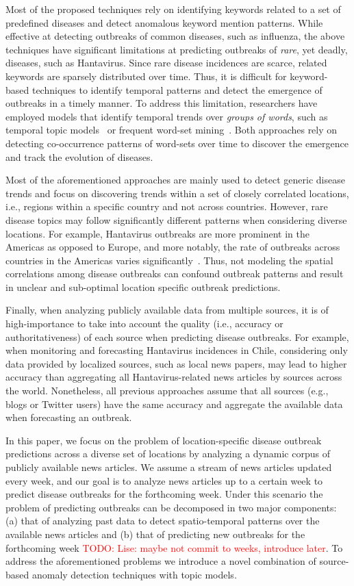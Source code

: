 \documentclass[conference]{IEEEtran}
\newcommand{\todo}[1]{\textcolor{red}{{TODO: #1}}}
\begin{document}
Most of the proposed techniques rely on identifying keywords related to a set of predefined diseases and detect anomalous keyword mention patterns. While effective at detecting outbreaks of common diseases, such as influenza, the above techniques have significant limitations at predicting outbreaks of {\em rare}, yet deadly, diseases, such as Hantavirus. Since rare disease incidences are scarce, related keywords are sparsely distributed over time. Thus, it is difficult for keyword- based techniques to identify temporal patterns and detect the emergence of outbreaks in a timely manner. To address this limitation, researchers have employed models that identify temporal trends over {\em groups of words}, such as temporal topic models~\cite{paul:11} or frequent word-set mining~\cite{parker:13}. Both approaches rely on detecting co-occurrence patterns of word-sets over time to discover the emergence and track the evolution of diseases. 

Most of the aforementioned approaches are mainly used to detect generic disease trends and focus on discovering trends within a set of closely correlated locations, i.e., regions within a specific country and not across countries. However, rare disease topics may follow significantly different patterns when considering diverse locations. For example, Hantavirus outbreaks are more prominent in the Americas as opposed to Europe, and more notably, the rate of outbreaks across countries in the Americas varies significantly~\cite{jonsson:10}. Thus, not modeling the spatial correlations among disease outbreaks can confound outbreak patterns and result in unclear and sub-optimal location specific outbreak predictions. 

Finally, when analyzing publicly available data from multiple sources, it is of high-importance to take into account the quality (i.e., accuracy or authoritativeness) of each source when predicting disease outbreaks. For example, when monitoring and forecasting Hantavirus incidences in Chile, considering only data provided by localized sources, such as local news papers, may lead to higher accuracy than aggregating all Hantavirus-related news articles by sources across the world. Nonetheless, all previous approaches assume that all sources (e.g., blogs or Twitter users) have the same accuracy and aggregate the available data when forecasting an outbreak. 

In this paper, we focus on the problem of location-specific disease outbreak predictions across a diverse set of locations by analyzing a dynamic corpus of publicly available news articles. We assume a stream of news articles updated every week, and our goal is to analyze news articles up to a certain week to predict disease outbreaks for the forthcoming week. Under this scenario the problem of predicting outbreaks can be decomposed in two major components: (a) that of analyzing past data to detect spatio-temporal patterns over the available news articles and (b) that of predicting new outbreaks for the forthcoming week \todo{Lise: maybe not commit to weeks, introduce later}. To address the aforementioned problems we introduce a novel combination of source-based anomaly detection techniques with topic models.
\end{document}
